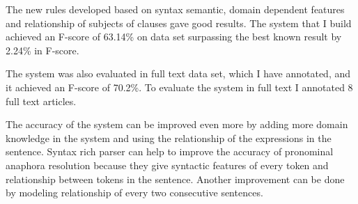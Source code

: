 The new rules developed based on syntax  semantic, domain dependent features and relationship of subjects of clauses gave good results. The system that I build achieved an F-score of 63.14\% on data set surpassing the best known result by 2.24\% in F-score. 

The system was also evaluated in full text data set, which I have annotated, and  it achieved an F-score of 70.2\%. To evaluate the system in full text I annotated 8 full text articles.

The accuracy of the system can be improved even more by adding more domain knowledge in the system and using the relationship of the expressions in the sentence. Syntax rich parser can help to improve the accuracy of pronominal anaphora resolution because they give  syntactic features of every token and relationship between tokens in the sentence. Another improvement can be done by modeling relationship of every two consecutive sentences.  